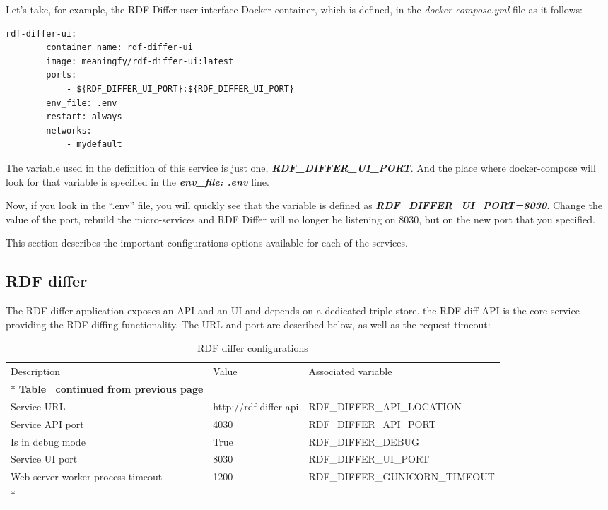 Let’s take, for example, the RDF Differ user interface Docker container, which is defined, in the \textit{docker-compose.yml} file as it follows:
\begin{lstlisting}[]
    rdf-differ-ui:
    	container_name: rdf-differ-ui
    	image: meaningfy/rdf-differ-ui:latest
    	ports:
    		- ${RDF_DIFFER_UI_PORT}:${RDF_DIFFER_UI_PORT}
    	env_file: .env
    	restart: always
    	networks:
    		- mydefault
\end{lstlisting}
The variable used in the definition of this service is just one, \textbf{\textit{RDF\_DIFFER\_UI\_PORT}}. And the place where docker-compose will look for that variable is specified in the \textbf{\textit{env\_file: .env}} line.

Now, if you look in the “.env” file, you will quickly see that the variable is defined as \textbf{\textit{RDF\_DIFFER\_UI\_PORT=8030}}. Change the value of the port, rebuild the micro-services and RDF Differ will no longer be listening on 8030, but on the new port that you specified.


This section describes the important configurations options available for each of the services.

\subsection{RDF differ}

The RDF differ application exposes an API and an UI and depends on a dedicated triple store. the RDF diff API is the core service providing the RDF diffing functionality. The URL and port are described below, as well as the request timeout:

\begin{longtable}[c]{@{}p{3.5cm}p{3.5cm}l@{}}
	\toprule
	Description                       & Value                 & Associated variable            \\* \midrule
	\endfirsthead
	\multicolumn{3}{c}%
	{{\bfseries Table \thetable\ continued from previous page}}                                \\
	\endhead
	\bottomrule
	\endfoot
	\endlastfoot
	Service URL                       & http://rdf-differ-api & RDF\_DIFFER\_API\_LOCATION     \\
	Service API port                  & 4030                  & RDF\_DIFFER\_API\_PORT         \\
	Is in debug mode                  & True                  & RDF\_DIFFER\_DEBUG             \\
	Service UI port                   & 8030                  & RDF\_DIFFER\_UI\_PORT          \\
	Web server worker process timeout & 1200                  & RDF\_DIFFER\_GUNICORN\_TIMEOUT \\* \bottomrule
	\caption{RDF differ configurations}
	\label{tab:my-table1}                                                                      \\
\end{longtable}

